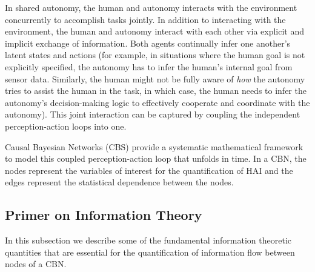 \documentclass[12pt]{article}
\begin{document}
In shared autonomy, the human and autonomy interacts with the environment concurrently to accomplish tasks jointly. In addition to interacting with the environment, the human and autonomy interact with each other via explicit and implicit exchange of information. Both agents continually infer one another's latent states and actions (for example, in situations where the human goal is not explicitly specified, the autonomy has to infer the human's internal goal from sensor data. Similarly, the human might not be fully aware of \textit{how} the autonomy tries to assist the human in the task, in which case, the human needs to infer the autonomy's decision-making logic to effectively cooperate and coordinate with the autonomy). This joint interaction can be captured by coupling the independent perception-action loops into one. 

Causal Bayesian Networks (CBS) provide a systematic mathematical framework to model this coupled perception-action loop that unfolds in time. In a CBN, the nodes represent the variables of interest for the quantification of HAI and the edges represent the statistical dependence between the nodes. 
%
%
%
\subsection{Primer on Information Theory}
In this subsection we describe some of the fundamental information theoretic quantities that are essential for the quantification of information flow between nodes of a CBN. 
\end{document}
